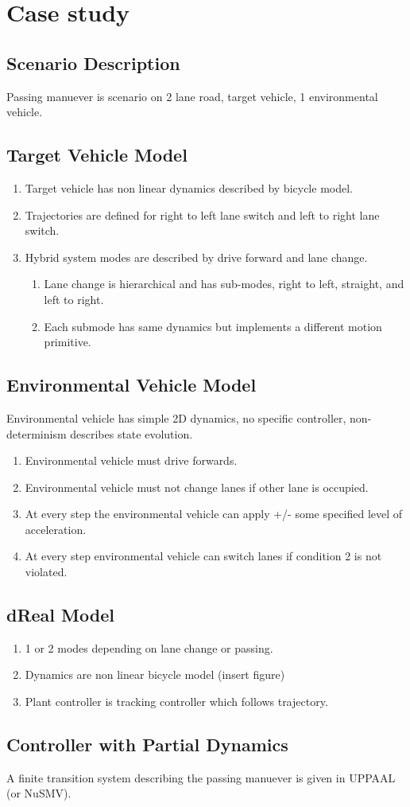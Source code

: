 \section{Case study}
\label{caseStudy}
\subsection{Scenario Description}
Passing manuever is scenario on 2 lane road, target vehicle, 1 environmental vehicle.
\subsection{Target Vehicle Model}
\begin{enumerate}
	\item Target vehicle has non linear dynamics described by bicycle model.
	\item Trajectories are defined for right to left lane switch and left to right lane switch.
	\item Hybrid system modes are described by drive forward and lane change.
	\begin{enumerate}
		\item Lane change is hierarchical and has sub-modes, right to left, straight, and left to right.
		\item Each submode has same dynamics but implements a different motion primitive.
	\end{enumerate}
\end{enumerate}
\subsection{Environmental Vehicle Model}
Environmental vehicle has simple 2D dynamics, no specific controller, non-determinism describes state evolution.
\begin{enumerate}
	\item Environmental vehicle must drive forwards.
	\item Environmental vehicle must not change lanes if other lane is occupied.
	\item At every step the environmental vehicle can apply +/- some specified level of acceleration.
	\item At every step environmental vehicle can switch lanes if condition 2 is not violated.
\end{enumerate}
\subsection{dReal Model}
\begin{enumerate}
	\item 1 or 2 modes depending on lane change or passing.
	\item Dynamics are non linear bicycle model (insert figure)
	\item Plant controller is tracking controller which follows trajectory.
\end{enumerate}
\subsection{Controller with Partial Dynamics}
A finite transition system describing the passing manuever is given in UPPAAL (or NuSMV).